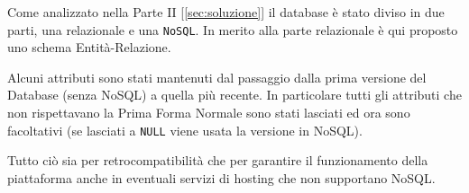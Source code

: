Come analizzato nella Parte II [\ref{sec:soluzione}] il database è stato diviso in due parti, una relazionale e una \texttt{NoSQL}. In merito alla parte relazionale è qui proposto uno schema Entità-Relazione.

Alcuni attributi sono stati mantenuti dal passaggio dalla prima versione del Database (senza NoSQL) a quella più recente. In particolare tutti gli attributi che non rispettavano la Prima Forma Normale sono stati lasciati ed ora sono facoltativi (se lasciati a \texttt{NULL} viene usata la versione in NoSQL).

Tutto ciò sia per retrocompatibilità che per garantire il funzionamento della piattaforma anche in eventuali servizi di hosting che non supportano NoSQL.